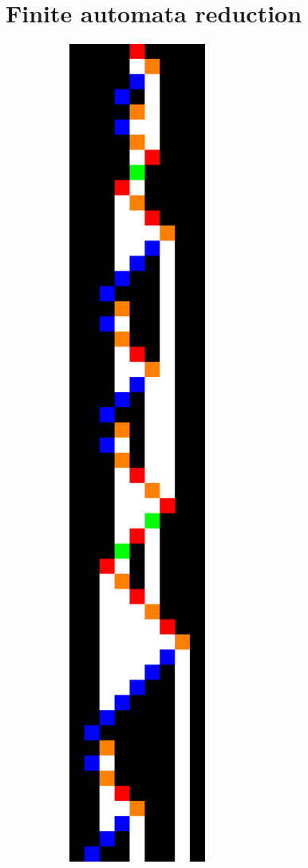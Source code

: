 \section{Finite automata reduction}\label{sec:finite-automata-reduction}
\usetikzlibrary {automata, positioning}

\begin{figure}
  \centering
  \begin{subfigure}[m]{0.125\textwidth}
    \centering
    \includegraphics[width=\textwidth]{space-time-diagrams/finite-automata-reduction-counter4.pdf}

\end{subfigure}
\end{figure}
